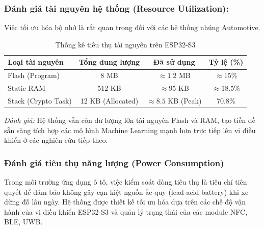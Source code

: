 \subsubsection{Đánh giá tài nguyên hệ thống (Resource Utilization):}
Việc tối ưu hóa bộ nhớ là rất quan trọng đối với các hệ thống nhúng Automotive.

\leavevmode
\begin{table}[H]
    \centering
    \caption{Thống kê tiêu thụ tài nguyên trên ESP32-S3}
    \label{tab:resource_usage}
    \begin{tabular}{|l|c|c|c|}
        \hline
        \textbf{Loại tài nguyên} & \textbf{Tổng dung lượng} & \textbf{Đã sử dụng} & \textbf{Tỷ lệ (\%)} \\
        \hline
        Flash (Program) & 8 MB & $\approx 1.2$ MB & $\approx 15\%$ \\
        \hline
        Static RAM & 512 KB & $\approx 95$ KB & $\approx 18.5\%$ \\
        \hline
        Stack (Crypto Task) & 12 KB (Allocated) & $\approx 8.5$ KB (Peak) & $70.8\%$ \\
        \hline
    \end{tabular}
\end{table}
\textit{Đánh giá:} Hệ thống vẫn còn dư lượng lớn tài nguyên Flash và RAM, tạo tiền đề sẵn sàng tích hợp các mô hình Machine Learning mạnh hơn trực tiếp lên vi điều khiển ở các nghiên cứu tiếp theo.


\subsubsection{Đánh giá tiêu thụ năng lượng (Power Consumption)}

Trong môi trường ứng dụng ô tô, việc kiểm soát dòng tiêu thụ là tiêu chí tiên quyết để đảm bảo không gây cạn kiệt nguồn ắc-quy (lead-acid battery) khi xe dừng đỗ lâu ngày. Hệ thống được thiết kế tối ưu hóa dựa trên các chế độ vận hành của vi điều khiển ESP32-S3 và quản lý trạng thái của các module NFC, BLE, UWB.

